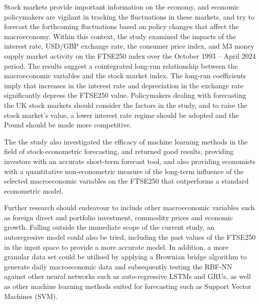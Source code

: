 \documentclass[12pt,a4paper]{article}
\begin{document}
Stock markets provide important information on the economy, 
and economic policymakers are vigilant in tracking the fluctuations 
in these markets, and try to forecast the 
forthcoming fluctuations based on policy changes that affect the macroeconomy.
Within this context, the study examined the 
impacts of the interest rate, USD/GBP
exchange rate, the consumer price index, and 
M3 money supply market activity on
the FTSE250 index over the October 1993 – April 2024 period.
The results suggest a cointegrated long-run
relationship between the macroeconomic variables and the stock market index. 
The long-run coefficients imply that
increases in the interest rate and depreciation in the exchange rate
significantly depress the FTSE250 value. 
Policymakers dealing with forecasting the UK stock markets
should consider the factors in the study, and to raise the stock
market's value, a lower interest rate regime should be adopted and 
the Pound should be made more competitive.

The the study also investigated the efficacy of machine learning methods in 
the field of stock-econometric forecasting, and returned good results, providing investors
with an accurate short-term forecast tool, and also providing economists
with a quantitative non-econometric measure of the 
long-term influence of the selected macroeconomic 
variables on the FTSE250 that outperforms a standard econometric model.

Further research should endeavour to include other macroeconomic variables such as 
foreign direct and portfolio investment, commodity prices and economic growth.
Falling outside the immediate scope of the current study, 
an autoregresive model could also be tried, including the past values of the 
FTSE250 in the input space to provide a more accurate model. In addition, 
a more granular data set could be utilised by applying a 
Brownian bridge algorithm to generate daily macroeconomic data and 
subsequently testing the RBF-NN against other neural networks 
such as auto-regressive LSTMs and GRUs, as well as other machine learning methods suited for 
forecasting such as Support Vector Machines (SVM). 



\end{document}
